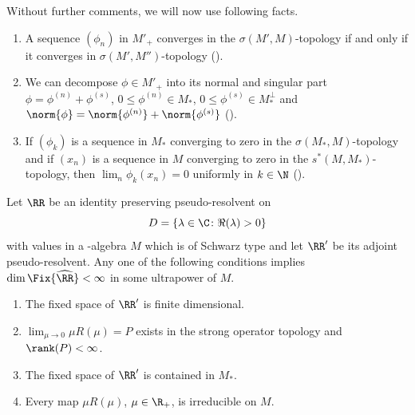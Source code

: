 \begin{remark}\label{rem:d4-remark}
Without further comments, we will now use following facts.
\begin{enumerate}[\upshape(i), wide, labelindent=.25em]
\item\label{rem:item1}
A sequence $ (\phi_{n}) $  in $ M'_{+} $  converges in the $ \sigma(M',M) $-topology if and only if it converges in $ \sigma(M',M'') $-topology (\textcite{akemann:1972}).

\item\label{rem:item2}
We can decompose $ \phi \in M'_{+} $  into its normal and singular part $ \phi = \phi^{(n)} + \phi^{(s)} $, $ 0 \leq \phi^{(n)} \in M_{*} $, $ 0 \leq \phi^{(s)} \in M_*^{\perp} $  and $ \norm{\phi} = \norm{\phi^{(n)}} + \norm{\phi^{(s)}} $  (\textcite[Theorem III.2.14]{takesaki:1979}).

\item\label{rem:item3}
If\/ $ (\phi_{k}) $  is a sequence in $ M_{*} $  converging to zero in the $ \sigma(M_{*},M) $-topology and if\/ $ (x_{n}) $  is a sequence in $ M $  converging to zero in the $ s^{*}(M,M_{*}) $-topology, then $ \lim_{n} \phi_{k}(x_{n}) = 0 $  uniformly in $ k \in \N $  (\textcite[Lemma III.5.5]{takesaki:1979}).
\end{enumerate}
\end{remark}
\begin{theorem}\label{thm:d4-4.4}
Let $ \RR $  be an identity preserving pseudo-resolvent on 
%
\[
	D = \{\lambda \in \C \colon  \Re(\lambda) > 0\} 
\]
%
with values in a \WA-algebra $ M $  which is of Schwarz type and let $ \RR' $  be its adjoint pseudo-resolvent.
Any one of the following conditions implies $ \dim \Fix{\widehat{\RR}} < \infty $  in some ultrapower of\/ $ M $.
\begin{enumerate}[\upshape (i)]
\item
The fixed space of\/ $ \RR' $  is finite dimensional.

\item
$ \lim_{\mu \to 0} \mu R(\mu) = P $  exists in the strong operator topology and $ \rank (P) < \infty $.

\item
The fixed space of\/ $ \RR' $  is contained in $ M_{*} $.

\item
Every map $ \mu R(\mu) $, $ \mu \in \R_{+} $, is irreducible on $ M $.
\end{enumerate}
\end{theorem}
